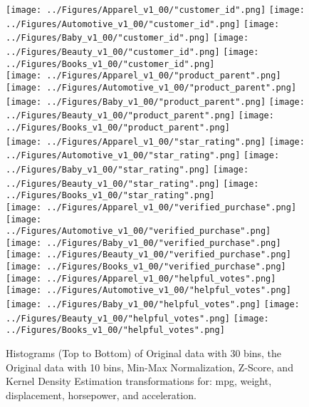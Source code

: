 \documentclass[10pt, conference, compsocconf]{IEEEtran}
\begin{document}
\begin{figure*}[htb]
	\vspace{-2mm}
	\centering
	\texttt{[image: ../Figures/Apparel\_v1\_00/"customer\_id".png]}
	\texttt{[image: ../Figures/Automotive\_v1\_00/"customer\_id".png]}
	\texttt{[image: ../Figures/Baby\_v1\_00/"customer\_id".png]}
	\texttt{[image: ../Figures/Beauty\_v1\_00/"customer\_id".png]}
	\texttt{[image: ../Figures/Books\_v1\_00/"customer\_id".png]}\\
	
	\centering
	\texttt{[image: ../Figures/Apparel\_v1\_00/"product\_parent".png]}
	\texttt{[image: ../Figures/Automotive\_v1\_00/"product\_parent".png]}
	\texttt{[image: ../Figures/Baby\_v1\_00/"product\_parent".png]}
	\texttt{[image: ../Figures/Beauty\_v1\_00/"product\_parent".png]}
	\texttt{[image: ../Figures/Books\_v1\_00/"product\_parent".png]}\\

	\centering
	\texttt{[image: ../Figures/Apparel\_v1\_00/"star\_rating".png]}
	\texttt{[image: ../Figures/Automotive\_v1\_00/"star\_rating".png]}
	\texttt{[image: ../Figures/Baby\_v1\_00/"star\_rating".png]}
	\texttt{[image: ../Figures/Beauty\_v1\_00/"star\_rating".png]}
	\texttt{[image: ../Figures/Books\_v1\_00/"star\_rating".png]}\\

	\centering
	\texttt{[image: ../Figures/Apparel\_v1\_00/"verified\_purchase".png]}
	\texttt{[image: ../Figures/Automotive\_v1\_00/"verified\_purchase".png]}
	\texttt{[image: ../Figures/Baby\_v1\_00/"verified\_purchase".png]}
	\texttt{[image: ../Figures/Beauty\_v1\_00/"verified\_purchase".png]}
	\texttt{[image: ../Figures/Books\_v1\_00/"verified\_purchase".png]}\\
	
	\centering
	\texttt{[image: ../Figures/Apparel\_v1\_00/"helpful\_votes".png]}
	\texttt{[image: ../Figures/Automotive\_v1\_00/"helpful\_votes".png]}
	\texttt{[image: ../Figures/Baby\_v1\_00/"helpful\_votes".png]}
	\texttt{[image: ../Figures/Beauty\_v1\_00/"helpful\_votes".png]}
	\texttt{[image: ../Figures/Books\_v1\_00/"helpful\_votes".png]}\\

	\caption{Histograms (Top to Bottom) of Original data with 30 bins, the Original data with 10 bins, Min-Max Normalization, Z-Score, and Kernel Density Estimation transformations for: mpg, weight, displacement, horsepower, and acceleration.}
	\label{fig3}
\end{figure*}
\end{document}
